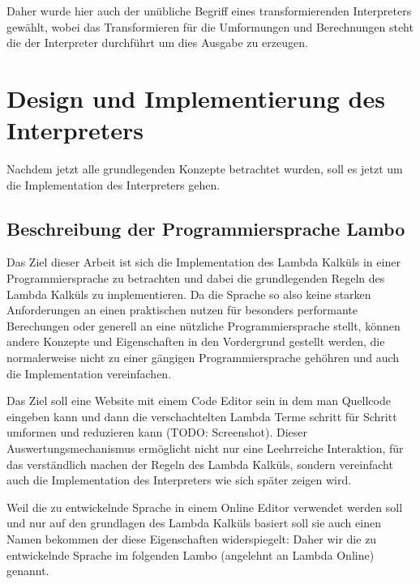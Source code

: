\documentclass[ngerman]{article}
\begin{document}
Daher wurde hier auch der unübliche Begriff eines transformierenden Interpreters gewählt, wobei das Transformieren für die Umformungen und Berechnungen steht die der Interpreter durchführt um dies Ausgabe zu erzeugen.

\section{Design und Implementierung des Interpreters}

Nachdem jetzt alle grundlegenden Konzepte betrachtet wurden, soll es jetzt um die Implementation des Interpreters gehen. 

\subsection{Beschreibung der Programmiersprache Lambo}

Das Ziel dieser Arbeit ist sich die Implementation des Lambda Kalküls in einer Programmiersprache zu betrachten und dabei die grundlegenden Regeln des Lambda Kalküls zu implementieren. Da die Sprache so also keine starken Anforderungen an einen praktischen nutzen für besonders performante Berechungen oder generell an eine nützliche Programmiersprache stellt, können andere Konzepte und Eigenschaften in den Vordergrund gestellt werden, die normalerweise nicht zu einer gängigen Programmiersprache gehöhren und auch die Implementation vereinfachen.

Das Ziel soll eine Website mit einem Code Editor sein in dem man Quellcode eingeben kann und dann die verschachtelten Lambda Terme schritt für Schritt umformen und reduzieren kann (TODO: Screenshot). Dieser Auswertungsmechanismus ermöglicht nicht nur eine Leehrreiche Interaktion, für das verständlich machen der Regeln des Lambda Kalküls, sondern vereinfacht auch die Implementation des Interpreters wie sich später zeigen wird.

Weil die zu entwickelnde Sprache in einem Online Editor verwendet werden soll und nur auf den grundlagen des Lambda Kalküls basiert soll sie auch einen Namen bekommen der diese Eigenschaften widerspiegelt:
Daher wir die zu entwickelnde Sprache im folgenden Lambo (angelehnt an Lambda Online) genannt.
\end{document}
